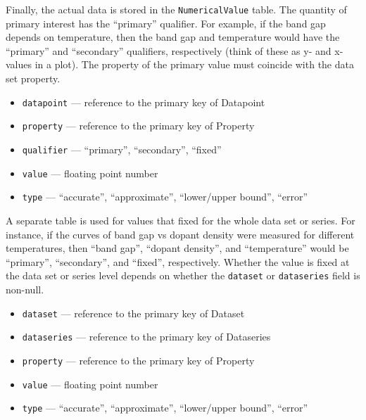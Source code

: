 \documentclass{article}
\begin{document}
Finally, the actual data is stored in the \texttt{NumericalValue} table. The quantity of primary interest has the ``primary'' qualifier. For example, if the band gap depends on temperature, then the band gap and temperature would have the ``primary'' and ``secondary'' qualifiers, respectively (think of these as y- and x-values in a plot). The property of the primary value must coincide with the data set property.
\begin{tcolorbox}[colback=green!5,colframe=green!40!black,title=NumericalValue(Base)]
  \begin{itemize}
  \item \texttt{datapoint} --- reference to the primary key of Datapoint
  \item \texttt{property} --- reference to the primary key of Property
  \item \texttt{qualifier} --- ``primary'', ``secondary'', ``fixed''
  \item \texttt{value} --- floating point number
  \item \texttt{type} --- ``accurate'', ``approximate'', ``lower/upper bound'', ``error''
  \end{itemize}
\end{tcolorbox}

A separate table is used for values that fixed for the whole data set or series. For instance, if the curves of band gap vs dopant density were measured for different temperatures, then ``band gap'', ``dopant density'', and ``temperature'' would be ``primary'', ``secondary'', and ``fixed'', respectively. Whether the value is fixed at the data set or series level depends on whether the \texttt{dataset} or \texttt{dataseries} field is non-null.
\begin{tcolorbox}[colback=green!5,colframe=green!40!black,title=NumericalValueFixed(Base)]
  \begin{itemize}
  \item \texttt{dataset} --- reference to the primary key of Dataset
  \item \texttt{dataseries} --- reference to the primary key of Dataseries
  \item \texttt{property} --- reference to the primary key of Property
  \item \texttt{value} --- floating point number
  \item \texttt{type} --- ``accurate'', ``approximate'', ``lower/upper bound'', ``error''
  \end{itemize}
\end{tcolorbox}
\end{document}
